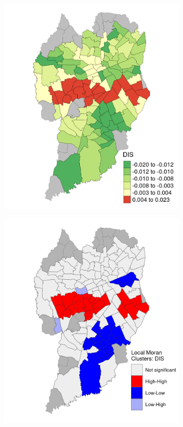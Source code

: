 \begin{figure}[!htbp]
    \centering\footnotesize
    \captionsetup{font=footnotesize}
    \caption{DIS COEFFICIENT ESTIMATES}
    \begin{subfigure}{0.5\textwidth}
        \includegraphics{fig/DIS.png}
    \end{subfigure}%
    \begin{subfigure}{0.5\textwidth}
        \includegraphics{fig/lisa_DIS.png}

\end{subfigure}
\end{figure}
